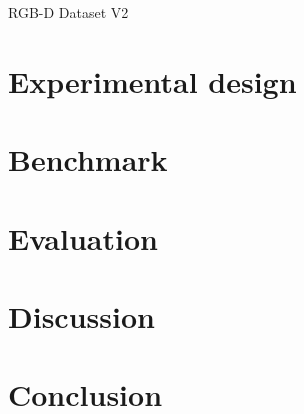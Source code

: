 \documentclass[10pt,twocolumn,letterpaper]{article}
\begin{document}
RGB-D Dataset V2 \cite{Lai2014}\\ 
\section{Experimental design}

\section{Benchmark}

\section{Evaluation}

\section{Discussion}

\section{Conclusion}




{\small


}
\end{document}
